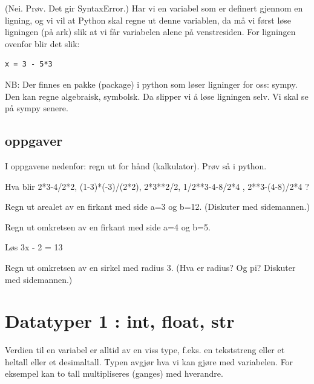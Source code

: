 {(Nei. Prøv. Det gir SyntaxError.) Har vi en variabel som er definert gjennom en ligning, og vi vil at Python skal regne ut denne variablen, da må vi først løse ligningen (på ark) slik at vi får variabelen alene på venstresiden. For ligningen ovenfor blir det slik: 

\begin{lstlisting}
x = 3 - 5*3
\end{lstlisting}

NB: Der finnes en pakke (package) i python som løser ligninger for oss: sympy. Den kan regne algebraisk, symbolsk. Da slipper vi å løse ligningen selv. Vi skal se på sympy senere. 

\subsection{oppgaver}

I oppgavene nedenfor: regn ut for hånd (kalkulator). Prøv så i python. 

\begin{question}
Hva blir 2*3-4/2*2, (1-3)*(-3)/(2*2), 2*3**2/2, 1/2**3-4-8/2*4 , 2**3-(4-8)/2*4 ?  
\end{question}

\begin{question}
Regn ut arealet av en firkant med side a=3 og b=12. (Diskuter med sidemannen.) 
\end{question}

\begin{question}
Regn ut omkretsen av en firkant med side a=4 og b=5.
\end{question}

\begin{question}
Løs 3x - 2 = 13 
\end{question}

\begin{question}
Regn ut omkretsen av en sirkel med radius 3. (Hva er radius? Og pi? Diskuter med sidemannen.)
\end{question}

\section{Datatyper 1 : int, float, str}

Verdien til en variabel er alltid av en viss type, f.eks. en tekststreng eller et heltall eller et desimaltall. Typen avgjør hva vi kan gjøre med variabelen. For eksempel kan to tall multipliseres (ganges) med hverandre.

}
